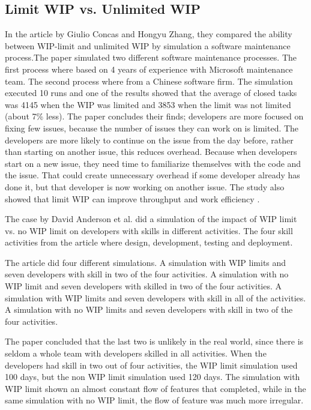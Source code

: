 \documentclass[UKenglish]{ifimaster}  %
\begin{document}
\subsection {Limit WIP vs. Unlimited WIP}
\label{sub:wip:vs:wip}
In the article by Giulio Concas and Hongyu Zhang, they compared the ability between WIP-limit and unlimited WIP by simulation a software maintenance process.The paper simulated two different software maintenance processes. The first process where based on 4 years of experience with Microsoft maintenance team. The second process where from a Chinese software firm.  The simulation executed 10 runs and one of the results showed that the average of closed tasks was 4145 when the WIP was limited and 3853 when the limit was not limited (about 7\% less). The paper concludes their finds; developers are more focused on fixing few issues, because the number of issues they can work on is limited. The developers are more likely to continue on the issue from the day before, rather than starting on another issue, this reduces overhead. Because when developers start on a new issue, they need time to familiarize themselves with the code and the issue. That could create unnecessary overhead if some developer already has done it, but that developer is now working on another issue. The study also showed that limit WIP can improve throughput and work efficiency \parencite{SMR:SMR1599}.

The case by David Anderson et al. \parencite{DavidAnderson} did a simulation of the impact of WIP limit vs. no WIP limit on developers with skills in different activities. The four skill activities from the article where design, development, testing and deployment. 

The article did four different simulations.  A simulation with WIP limits and seven developers with skill in two of the four activities. A simulation with no WIP limit and seven developers with skilled in two of the four activities. A simulation with WIP limits and seven developers with skill in all of the activities. A simulation with no WIP limits and seven developers with skill in two of the four activities.

The paper concluded that the last two is unlikely in the real world, since there is seldom a whole team with developers skilled in all activities. 
When the developers had skill in two out of four activities, the WIP limit simulation used 100 days, but the non WIP limit simulation used 120 days. The simulation with WIP limit shown an almost constant flow of features that completed, while in the same simulation with no WIP limit, the flow of feature was much more irregular\parencite{DavidAnderson}.
\end{document}
